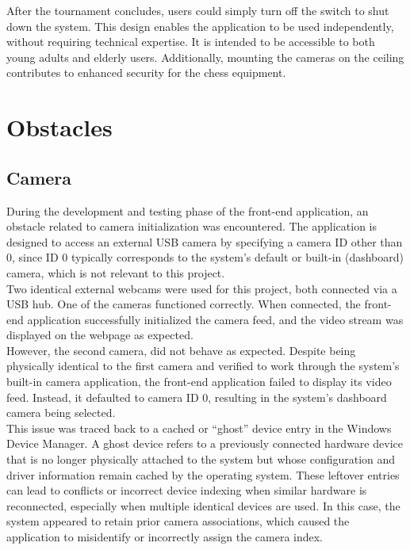 After the tournament concludes, users could simply turn off the switch to shut down the system. This design enables the application to be used independently, without requiring technical expertise. It is intended to be accessible to both young adults and elderly users. Additionally, mounting the cameras on the ceiling contributes to enhanced security for the chess equipment.

\section{Obstacles}
\subsection{Camera}
During the development and testing phase of the front-end application, an obstacle related to camera initialization was encountered. The application is designed to access an external USB camera by specifying a camera ID other than 0, since ID 0 typically corresponds to the system's default or built-in (dashboard) camera, which is not relevant to this project.\\

Two identical external webcams were used for this project, both connected via a USB hub. One of the cameras functioned correctly. When connected, the front-end application successfully initialized the camera feed, and the video stream was displayed on the webpage as expected.\\

However, the second camera, did not behave as expected. Despite being physically identical to the first camera and verified to work through the system's built-in camera application, the front-end application failed to display its video feed. Instead, it defaulted to camera ID 0, resulting in the system's dashboard camera being selected.\\

This issue was traced back to a cached or “ghost” device entry in the Windows Device Manager. A ghost device refers to a previously connected hardware device that is no longer physically attached to the system but whose configuration and driver information remain cached by the operating system. These leftover entries can lead to conflicts or incorrect device indexing when similar hardware is reconnected, especially when multiple identical devices are used. In this case, the system appeared to retain prior camera associations, which caused the application to misidentify or incorrectly assign the camera index.

